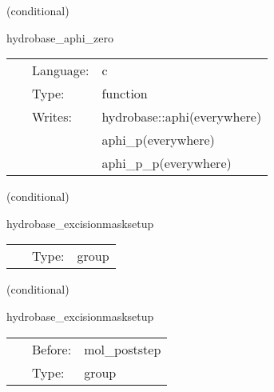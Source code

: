 \vspace{5mm}

   (conditional) 

\hspace{5mm} hydrobase\_aphi\_zero 

\hspace{5mm}{\it set vector potential phi to 0 } 


\hspace{5mm}

 \begin{tabular*}{160mm}{cll} 
~ & Language:  & c \\ 
~ & Type:  & function \\ 
~ & Writes:  & hydrobase::aphi(everywhere) \\ 
~& ~ &aphi\_p(everywhere)\\ 
~& ~ &aphi\_p\_p(everywhere)\\ 
\end{tabular*} 


\vspace{5mm}

   (conditional) 

\hspace{5mm} hydrobase\_excisionmasksetup 

\hspace{5mm}{\it set up hydro excision mask } 


\hspace{5mm}

 \begin{tabular*}{160mm}{cll} 
~ & Type:  & group \\ 
\end{tabular*} 


\vspace{5mm}

   (conditional) 

\hspace{5mm} hydrobase\_excisionmasksetup 

\hspace{5mm}{\it set up hydro excision mask } 


\hspace{5mm}

 \begin{tabular*}{160mm}{cll} 
~ & Before:  & mol\_poststep \\ 
~ & Type:  & group \\ 
\end{tabular*} 


